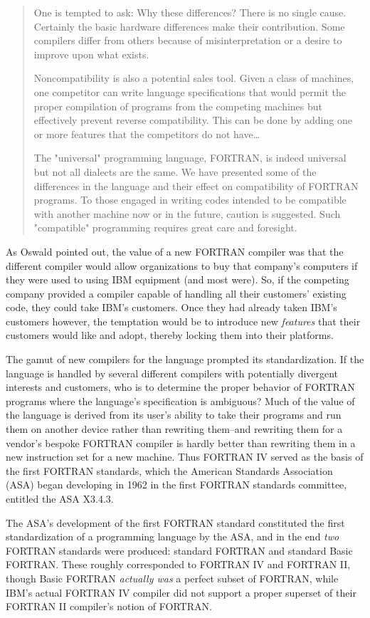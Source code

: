 \begin{quotation}
	One is tempted to ask: Why these differences? There
	is no single cause. Certainly the basic hardware differences make
	their contribution. Some compilers differ from
	others because of misinterpretation or a desire to improve upon what exists.

	Noncompatibility is also a potential sales tool. Given a class
	of machines, one competitor can write language specifications
	that would permit the proper compilation of
	programs from the competing machines but effectively
	prevent reverse compatibility.
	This can be done by adding
	one or more features that the competitors do not have\dots

	The "universal" programming language, FORTRAN,
	is indeed universal but not all dialects are the same. We
	have presented some of the differences in the language
	and their effect on compatibility of FORTRAN programs.
	To those engaged in writing codes intended to be
	compatible with another machine now or in the future,
	caution is suggested. Such "compatible" programming
	requires great care and foresight.
\end{quotation}

As Oswald pointed out, the value of a new FORTRAN compiler was that
the different compiler would allow organizations to buy that company's
computers if they were used to using IBM equipment (and most were).
So, if the competing company provided a compiler capable of handling
all their customers' existing code, they could take IBM's customers.
Once they had already taken IBM's customers however, the temptation would
be to introduce new \textit{features} that their customers would like and
adopt, thereby locking them into their platforms.

The gamut of new compilers for the language prompted its standardization.
If the language is handled by several different compilers with potentially
divergent interests and customers, who is to determine the proper behavior
of FORTRAN programs where the language's specification is ambiguous?
Much of the value of the language is derived from its user's ability
to take their programs and run them on another device rather than
rewriting them--and rewriting them for a vendor's bespoke FORTRAN
compiler is hardly better than rewriting them in a new instruction set
for a new machine.
Thus FORTRAN IV served as the basis of the first FORTRAN standards,
which the American Standards Association (ASA) began developing in 1962
in the first FORTRAN standards committee, entitled the ASA X3.4.3.

The ASA's development of the first FORTRAN standard constituted the
first standardization of a programming language by the ASA,
and in the end \textit{two} FORTRAN standards were produced:
standard FORTRAN and standard Basic FORTRAN.
These roughly corresponded to FORTRAN IV and FORTRAN II, though
Basic FORTRAN \textit{actually was} a perfect subset of FORTRAN,
while IBM's actual FORTRAN IV compiler did not support a proper
superset of their FORTRAN II compiler's notion of FORTRAN.
